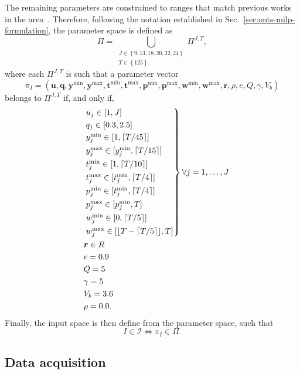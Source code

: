 The remaining parameters are constrained to ranges that match previous works in the area~\cite{rigoBranchandpriceAlgorithmNanosatellite2022,semanEnergyAwareTaskScheduling2022,rigoTaskSchedulingOptimal2021}.
Therefore, following the notation established in Sec.~\ref{sec:onts-milp-formulation}, the parameter space is defined as \[
\Pi = \bigcup_{\substack{J \in \left\{ 9,13,18,20,22,24 \right\} \\ T \in \left\{ 125 \right\} }} \Pi^{J,T}
,\] where each $\Pi^{J,T}$ is such that a parameter vector \[
\pi_I= \left( \bm{u}, \bm{q}, \bm{y}^{\min}, \bm{y}^{\max}, \bm{t}^{\min}, \bm{t}^{\max}, \bm{p}^{\min}, \bm{p}^{\max}, \bm{w}^{\min}, \bm{w}^{\max}, \bm{r}, \rho, e, Q, \gamma, V_b \right)
\] belongs to $\Pi^{J,T}$ if, and only if,
\begin{equation*}
\begin{aligned}
&\begin{rcases}
    & u_j \in [1, J] \\
	 & q_j \in [0.3, 2.5] \\
    	 & y_j^{\min} \in [1, \lceil T/45 \rceil] \\
    	 & y_j^{\max} \in [y_j^{\min}, \lceil T/15 \rceil] \\
    	 & t_j^{\min} \in [1, \lceil T/10 \rceil] \\
    	 & t_j^{\max} \in [t_j^{\min}, \lceil T/4 \rceil] \\
    	 & p_j^{\min} \in [t_j^{\min}, \lceil T/4 \rceil] \\
    	 & p_j^{\max} \in [p_j^{\min}, T] \\
    	 & w_j^{\min} \in [0, \lceil T/5 \rceil] \\
    	 & w_j^{\max} \in [\lfloor T-\lceil T/5 \rceil \rfloor, T]
\end{rcases} \forall j =1,\ldots,J \\
    &\quad \bm{r} \in R \\
    &\quad e = 0.9 \\
    &\quad Q = 5 \\
    &\quad \gamma = 5 \\
    &\quad V_b = 3.6 \\
    &\quad \rho = 0.0
.\end{aligned}
\end{equation*}
Finally, the input space is then define from the parameter space, such that \[
    I\in \mathcal{I} \iff \pi_I \in \Pi 
.\] 


\subsection{Data acquisition}

